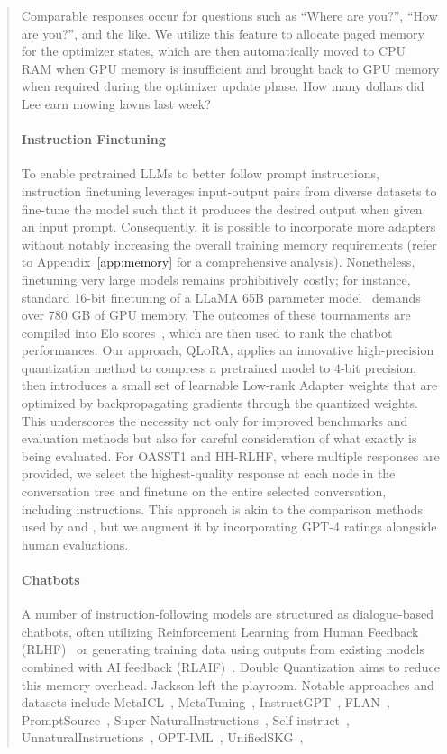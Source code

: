 \begin{quote}
{{Comparable responses occur for questions such as ``Where are you?'', ``How are you?'', and the like. We utilize this feature to allocate paged memory for the optimizer states, which are then automatically moved to CPU RAM when GPU memory is insufficient and brought back to GPU memory when required during the optimizer update phase. How many dollars did Lee earn mowing lawns last week? \paragraph{Instruction Finetuning} To enable pretrained LLMs to better follow prompt instructions, instruction finetuning leverages input-output pairs from diverse datasets to fine-tune the model such that it produces the desired output when given an input prompt. Consequently, it is possible to incorporate more adapters without notably increasing the overall training memory requirements (refer to Appendix~\ref{app:memory} for a comprehensive analysis). Nonetheless, finetuning very large models remains prohibitively costly; for instance, standard 16-bit finetuning of a LLaMA 65B parameter model~\citep{touvron2023llama} demands over 780 GB of GPU memory. The outcomes of these tournaments are compiled into Elo scores~\citep{elo1967proposed, elo1978rating}, which are then used to rank the chatbot performances. Our approach, \textsc{QLoRA}, applies an innovative high-precision quantization method to compress a pretrained model to 4-bit precision, then introduces a small set of learnable Low-rank Adapter weights \citep{hu2021lora} that are optimized by backpropagating gradients through the quantized weights. This underscores the necessity not only for improved benchmarks and evaluation methods but also for careful consideration of what exactly is being evaluated. For OASST1 and HH-RLHF, where multiple responses are provided, we select the highest-quality response at each node in the conversation tree and finetune on the entire selected conversation, including instructions. This approach is akin to the comparison methods used by \citet{bai2022training} and \citet{vicuna2023}, but we augment it by incorporating GPT-4 ratings alongside human evaluations. \paragraph{Chatbots} A number of instruction-following models are structured as dialogue-based chatbots, often utilizing Reinforcement Learning from Human Feedback (RLHF)~\citep{christiano2017deep} or generating training data using outputs from existing models combined with AI feedback (RLAIF)~\citep{bai2022constitutional}. Double Quantization aims to reduce this memory overhead. Jackson left the playroom. Notable approaches and datasets include MetaICL~\citep{min2021metaicl}, MetaTuning~\citep{zhong2021adapting}, InstructGPT~\citep{ouyang2022training}, FLAN~\citep{wei2021finetuned,chung2022scaling}, PromptSource~\citep{bach2022promptsource}, Super-NaturalInstructions~\citep{wang2022super,sanh2021multitask}, Self-instruct~\citep{wang2022self}, UnnaturalInstructions~\citep{honovich2022unnatural}, OPT-IML~\citep{iyer2022opt}, UnifiedSKG~\citep{xie2022unifiedskg}, }}
\end{quote}

